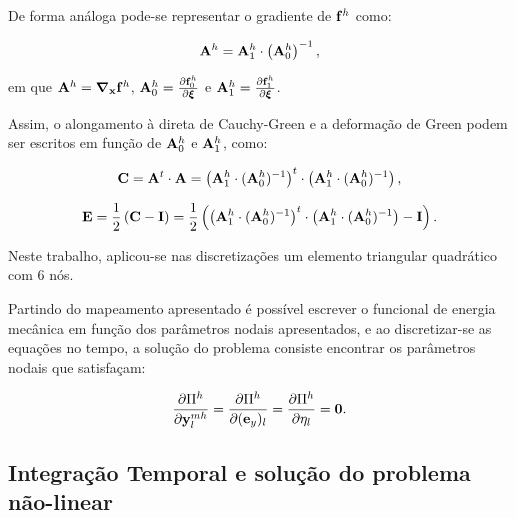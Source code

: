 De forma análoga pode-se representar o gradiente de  $\mathbf{f}^{h}$ como:

\begin{align}
\mathbf{A}^{h} = \mathbf{A}^{h}_{1} \cdot \left(\mathbf{A}^{h}_{0}\right)^{-1} \label{eq:gradDeformation},
\end{align}

\noindent em que $\mathbf{A}^{h} = \boldsymbol{\nabla}_{\mathbf{x}} \mathbf{f}^{h}$, $\mathbf{A}^{h}_{0} = \frac{\partial  \mathbf{f}^{h}_{0}} {\partial \boldsymbol{\xi}}$ e  $\mathbf{A}^{h}_{1} =  \frac{\partial  \mathbf{f}^{h}_{1}} {\partial \boldsymbol{\xi}}$.

Assim, o alongamento à direta de Cauchy-Green e a deformação de Green podem ser escritos em função de $\mathbf{A}^{h}_{0}$ e $\mathbf{A}^{h}_{1}$, como:

\begin{align}
	\mathbf{C} = \mathbf{A}^{t} \cdot \mathbf{A} = \left(\mathbf{A}^{h}_{1} \cdot (\mathbf{A}^{h}_{0})^{-1}\right)^{t} \cdot \left(\mathbf{A}^{h}_{1} \cdot (\mathbf{A}^{h}_{0})^{-1}\right),
\end{align}

\begin{align}
	\mathbf{E} = \frac{1}{2}\left(\mathbf{C} - \mathbf{I}\right) = \frac{1}{2}\left(\left(\mathbf{A}^{h}_{1} \cdot (\mathbf{A}^{h}_{0})^{-1}\right)^{t} \cdot \left(\mathbf{A}^{h}_{1} \cdot (\mathbf{A}^{h}_{0})^{-1}\right) - \mathbf{I}\right).
\end{align}


Neste trabalho, aplicou-se nas discretizações um elemento triangular quadrático com 6 nós.

Partindo do mapeamento apresentado é possível escrever o funcional de energia mecânica em função dos parâmetros nodais apresentados, e ao discretizar-se as equações no tempo, a solução do problema consiste encontrar os parâmetros nodais que satisfaçam:

\begin{align}
	\frac{\partial\Pi^{h}}{\partial \mathbf{y}_{l}^{mh}} = \frac{\partial\Pi^{h}}{\partial (\mathbf{e}_y)_l} = \frac{\partial\Pi^{h}}{\partial \eta_l} = \mathbf{0}.
\end{align}

\subsection{Integração Temporal e solução do problema não-linear}

